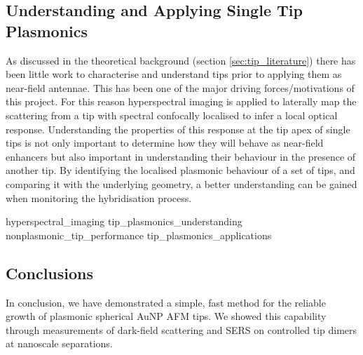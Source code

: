 \documentclass[12pt, a4paper, oneside]{book}
\begin{document}
\begin{singlespace}
\chapter{Understanding and Applying Single Tip Plasmonics}
\end{singlespace}


As discussed in the theoretical background (section \ref{sec:tip_literature}) there has been little work to characterise and understand tips prior to applying them as near-field antennae. This has been one of the major {\color{red}driving forces/motivations} of this project. For this reason hyperspectral imaging is applied to laterally map the scattering from a tip with spectral confocally localised to infer a local optical response.
Understanding the properties of this response at the tip apex of single tips is not only important to determine how they will behave as near-field enhancers but also important in understanding their behaviour in the presence of another tip. By identifying the localised plasmonic behaviour of a set of tips, and comparing it with the underlying geometry, a better understanding can be gained when monitoring the hybridisation process.


{hyperspectral_imaging}
{tip_plasmonics_understanding}
{nonplasmonic_tip_performance}
{tip_plasmonics_applications}

\section{Conclusions}

In conclusion, we have demonstrated a simple, fast method for the reliable growth of plasmonic spherical AuNP AFM tips. We showed this capability through measurements of dark-field scattering and SERS on controlled tip dimers at nanoscale separations.

\ifstandalone
\begin{singlespace}
\fontsize{8pt}{1em}\selectfont
\printbibliography[notcategory=fullcited]
\end{singlespace}
\fi
\end{document}
